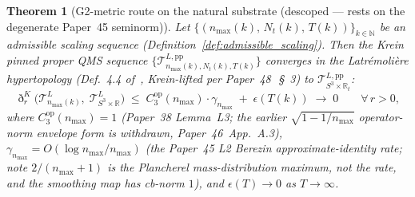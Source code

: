 \documentclass[11pt,a4paper]{article}
\theoremstyle{plain}
\newtheorem{theorem}{Theorem}[section]
\theoremstyle{definition}
\newcommand{\nmax}{n_{\max}}
\newcommand{\Tcal}{\mathcal{T}}
\newcommand{\R}{\mathbb{R}}
\newcommand{\N}{\mathbb{N}}
\newcommand{\Cthreeop}{C_{3}^{\mathrm{op}}}
\begin{document}
\begin{theorem}[G2-metric route on the natural substrate (descoped --- rests on the degenerate Paper~45 seminorm)]\label{thm:g2_metric}
Let $\{(n_{\max}(k),\, N_{t}(k),\, T(k))\}_{k \in \N}$ be an
admissible scaling sequence (Definition~\ref{def:admissible_scaling}).
Then the Krein pinned proper QMS sequence
$\{\Tcal^{L,\mathrm{pp}}_{n_{\max}(k), N_{t}(k), T(k)}\}$ converges
in the Latr\'emoli\`ere hypertopology
(Def.~4.4 of~\cite{latremoliere2025_hypertopology}, Krein-lifted
per Paper~48~\cite{paper48}\,\S~3) to
$\Tcal^{L,\mathrm{pp}}_{S^{3} \times \R_{t}}$:
\begin{equation}\label{eq:g2_metric_bound}
   \eth_{r}^{K}\bigl(\Tcal^{L}_{n_{\max}(k)},\;
   \Tcal^{L}_{S^{3} \times \R}\bigr)
   \;\le\; \Cthreeop(\nmax) \cdot \gamma_{\nmax}
          \;+\; \epsilon(T(k))
   \;\to\; 0
   \qquad \forall\, r > 0,
\end{equation}
where $\Cthreeop(\nmax) = 1$ (Paper~38 Lemma~L3; the earlier
$\sqrt{1 - 1/\nmax}$ operator-norm envelope form is \emph{withdrawn},
Paper~46~App.~A.3), $\gamma_{\nmax} = O(\log\nmax/\nmax)$ (the Paper~45 L2
Berezin approximate-identity rate; note $2/(\nmax+1)$ is the Plancherel
mass-distribution maximum, not the rate, and the smoothing map has cb-norm
$1$), and $\epsilon(T) \to 0$ as $T \to \infty$.
\end{theorem}
\end{document}
